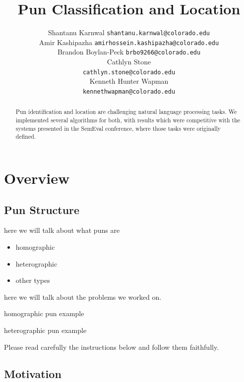 \documentclass{article}
\title{Pun Classification and Location}
\author{
	Shantanu Karnwal
	\texttt{shantanu.karnwal@colorado.edu} \\
	\And
	Amir Kashipazha
	\texttt{amirhossein.kashipazha@colorado.edu} \\
	\And
	Brandon Boylan-Peck
	\texttt{brbo9266@colorado.edu} \\
	\And
	Cathlyn Stone\\
	\texttt{cathlyn.stone@colorado.edu} \\
	\And
	Kenneth Hunter Wapman\\
	\texttt{kennethwapman@colorado.edu} \\
}
\begin{document}
\maketitle

\begin{abstract}
	Pun identification and location are challenging natural language processing 
	tasks. We implemented several algorithms for both, with results which 
	were competitive with the systems presented in the SemEval conference, where
	those tasks were originally defined.
\end{abstract}


\section{Overview}

\subsection{Pun Structure}

here we will talk about what puns are
\begin{itemize}

\item homographic
\item heterographic
\item other types

\end{itemize}

here we will talk about the problems we worked on.

\begin{center}
	homographic pun example
\end{center}

\begin{center}
	heterographic pun example
\end{center}

Please read carefully the instructions below and follow them
faithfully.

\subsection{Motivation}
\end{document}
